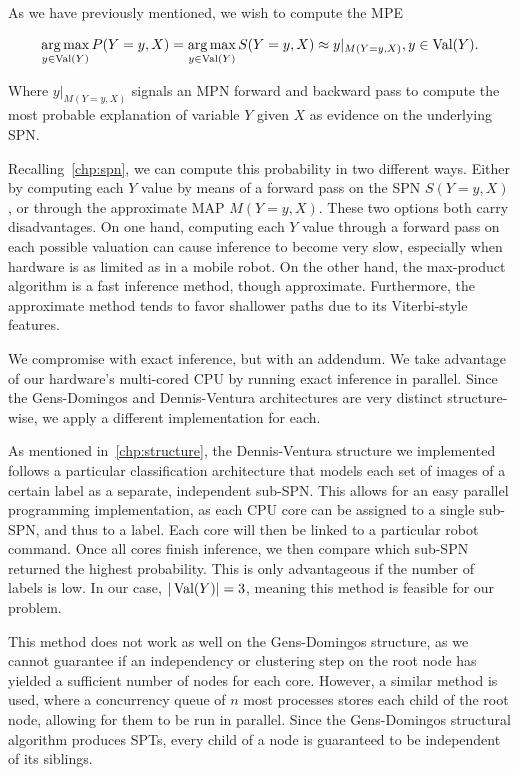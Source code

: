 As we have previously mentioned, we wish to compute the MPE

\begin{equation}
  \operatorname*{arg\,max}_{y\in\operatorname*{\text{Val}}(Y)} P(Y=y,X)=\operatorname*{arg\,max}_{y\in\operatorname*{\text{Val}}(Y)}S(Y=y,X)\approx y|_{M(Y=y,X)}, y\in\operatorname*{\text{Val}}(Y).
\end{equation}

Where $y|_{M(Y=y,X)}$ signals an MPN forward and backward pass to compute the most probable
explanation of variable $Y$ given $X$ as evidence on the underlying SPN.

Recalling~\autoref{chp:spn}, we can compute this probability in two different ways. Either
by computing each $Y$ value by means of a forward pass on the SPN $S(Y=y,X)$, or through the
approximate MAP $M(Y=y,X)$. These two options both carry disadvantages. On one hand, computing each
$Y$ value through a forward pass on each possible valuation can cause inference to become very
slow, especially when hardware is as limited as in a mobile robot. On the other hand, the
max-product algorithm is a fast inference method, though approximate. Furthermore, the approximate
method tends to favor shallower paths due to its Viterbi-style features.

We compromise with exact inference, but with an addendum. We take advantage of our hardware's
multi-cored CPU by running exact inference in parallel. Since the Gens-Domingos and Dennis-Ventura
architectures are very distinct structure-wise, we apply a different implementation for each.

As mentioned in~\autoref{chp:structure}, the Dennis-Ventura structure we implemented follows a
particular classification architecture that models each set of images of a certain label as a
separate, independent sub-SPN. This allows for an easy parallel programming implementation, as each
CPU core can be assigned to a single sub-SPN, and thus to a label. Each core will then be linked to
a particular robot command. Once all cores finish inference, we then compare which sub-SPN returned
the highest probability. This is only advantageous if the number of labels is low. In our case,
$|\operatorname*{\text{Val}}(Y)|=3$, meaning this method is feasible for our problem.

This method does not work as well on the Gens-Domingos structure, as we cannot guarantee if
an independency or clustering step on the root node has yielded a sufficient number of nodes for
each core. However, a similar method is used, where a concurrency queue of $n$ most processes
stores each child of the root node, allowing for them to be run in parallel. Since the
Gens-Domingos structural algorithm produces SPTs, every child of a node is guaranteed to be
independent of its siblings.

